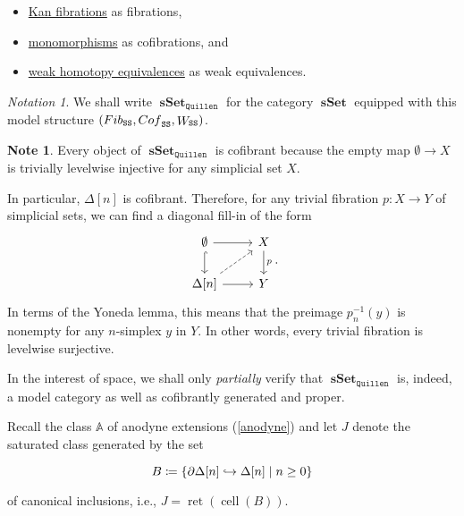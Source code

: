 \documentclass[10pt,letterpaper,cm]{nupset}
\theoremstyle{definition}
\newtheorem{note}[definition]{Note}
\theoremstyle{theorem}
\theoremstyle{remark}
\newtheorem*{notation}{Notation}
\newcommand{\0}{\mathbf{0}}
\newcommand{\1}{\mathbf{1}}
\newcommand{\2}{\mathbf{2}}
\DeclareMathOperator{\sset}{\mathbf{sSet}}
\DeclareMathOperator{\fib}{\mathnormal{Fib}}
\DeclareMathOperator{\cof}{\mathnormal{Cof}}
\DeclareMathOperator{\we}{\mathnormal{W}}
\DeclareMathOperator{\cell}{cell}
\DeclareMathOperator{\ret}{ret}
\newcommand{\bi}{\begin{itemize}}
\newcommand{\ei}{\end{itemize}}
\begin{document}
\bi
\item \underline{Kan fibrations} as fibrations,
\item \underline{monomorphisms} as cofibrations, and
\item \underline{weak homotopy equivalences} as weak equivalences.
\ei

\begin{notation}
We shall write $\sset_{\mathtt{Quillen}}$ for the category $\sset$ equipped with this model structure $\mleft(\fib_{\mathtt{SS}}, \cof_{\mathtt{SS}}, \we_{\mathtt{SS}}\mright)$. 
\end{notation}

\smallskip


\begin{note}\label{trivsurj}
Every object of $\sset_{\mathtt{Quillen}}$ is cofibrant because the empty map $\emptyset \to X$ is trivially levelwise injective for any simplicial set $X$.

\smallskip

In particular, $\Delta[n]$ is cofibrant. Therefore, for any trivial fibration $p : X \to Y$ of simplicial sets, we can find a diagonal fill-in of the form
\[
\begin{tikzcd}
\emptyset \arrow[r] \arrow[d, hook]                 & X \arrow[d, "p"] \\
{\Delta[n]} \arrow[r] \arrow[ru, dashed] & Y               
\end{tikzcd}
.\] In terms of the Yoneda lemma, this means that the preimage $p_n^{-1}(y)$ is nonempty for any $n$-simplex $y$ in $Y$. In other words, every trivial fibration is levelwise surjective.
\end{note}

\smallskip 

In the interest of space, we shall only \emph{partially} verify that $\sset_{\mathtt{Quillen}}$ is, indeed, a model category as well as cofibrantly generated and proper.


\medskip

Recall the class $\mathbb{A}$ of anodyne extensions (\cref{anodyne}) and let $J$ denote the saturated class generated by the set 

\[ \label{classB}
B\coloneqq \mleft\{\partial{\Delta[n]} \hookrightarrow \Delta[n] \mid n\geq 0\mright\}
\] 

of canonical inclusions, i.e., $J = \ret(\cell(B))$.
\end{document}
